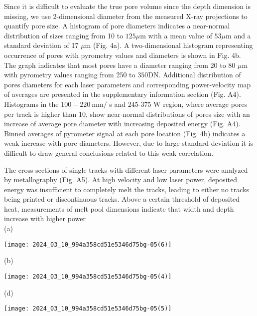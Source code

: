 \documentclass[10pt]{article}
\begin{document}
Since it is difficult to evaluate the true pore volume since the depth dimension is missing, we use 2-dimensional diameter from the measured X-ray projections to quantify pore size. A histogram of pore diameters indicates a near-normal distribution of sizes ranging from 10 to $125 \mu \mathrm{m}$ with a mean value of $53 \mu \mathrm{m}$ and a standard deviation of 17 $\mu \mathrm{m}$ (Fig. 4a). A two-dimensional histogram representing occurrence of pores with pyrometry values and diameters is shown in Fig. 4b. The graph indicates that most pores have a diameter ranging from 20 to 80 $\mu \mathrm{m}$ with pyrometry values ranging from 250 to $350 \mathrm{DN}$. Additional distribution of pores diameters for each laser parameters and corresponding power-velocity map of averages are presented in the supplementary information section (Fig. A4). Histograms in the $100-220 \mathrm{~mm} /$ s and 245-375 W region, where average pores per track is higher than 10, show near-normal distributions of pores size with an increase of average pore diameter with increasing deposited energy (Fig. A4). Binned averages of pyrometer signal at each pore location (Fig. 4b) indicates a weak increase with pore diameters. However, due to large standard deviation it is difficult to draw general conclusions related to this weak correlation.

The cross-sections of single tracks with different laser parameters were analyzed by metallography (Fig. A5). At high velocity and low laser power, deposited energy was insufficient to completely melt the tracks, leading to either no tracks being printed or discontinuous tracks. Above a certain threshold of deposited heat, measurements of melt pool dimensions indicate that width and depth increase with higher power\\
(a)

\begin{center}
\texttt{[image: 2024\_03\_10\_994a358cd51e5346d75bg-05(6)]}
\end{center}

(b)

\begin{center}
\texttt{[image: 2024\_03\_10\_994a358cd51e5346d75bg-05(4)]}
\end{center}

(d)

\begin{center}
\texttt{[image: 2024\_03\_10\_994a358cd51e5346d75bg-05(5)]}
\end{center}
\end{document}
